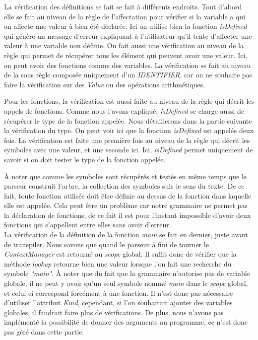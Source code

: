\documentclass[a4paper]{article}%
\begin{document}
La vérification des définitions se fait se fait à différents endroits. Tout
d'abord elle se fait au niveau de la règle de l'affectation pour vérifier si la
variable a qui on affecte une valeur à bien été déclarée. Ici on utilise bien la
fonction \textit{isDefined} qui génère un message d'erreur expliquant à
l'utilisateur qu'il tente d'affecter une valeur à une variable non définie. On
fait aussi une vérification au niveau de la règle qui permet de récupérer tous
les élément qui peuvent avoir une valeur. Ici, on peut avoir des fonctions
comme des variables. La vérification se fait au niveau de la sous règle composée
uniquement d'un \textit{IDENTIFIER}, car on ne souhaite pas faire la
vérification sur des \textit{Value} ou des opérations arithmétiques.

Pour les fonctions, la vérification est aussi faite au niveau de la règle qui
décrit les appels de fonctions. Comme nous l'avons expliqué, \textit{isDefined}
se charge aussi de récupérer le type de la fonction appelée. Nous détaillerons
dans la partie suivante la vérification du type. On peut voir ici que la
fonction \textit{isDefined} est appelée deux fois. La vérification est faite une
première fois au niveau de la règle qui décrit les symboles avec une valeur, et
une seconde ici. Ici, \textit{isDefined} permet uniquement de savoir si on
doit tester le type de la fonction appelée.

À noter que comme les symboles sont récupérés et testés en même temps que le
parseur construit l'arbre, la collection des symboles suis le sens du texte. De
ce fait, toute fonction utilisée doit être définie au dessus de la fonction dans
laquelle elle est appelée. Cela peut être un problème car notre grammaire ne
permet pas la déclaration de fonctions, de ce fait il est pour l'instant
impossible d'avoir deux fonctions qui s'appellent entre elles sans avoir
d'erreur.\\

La vérification de la définition de la fonction \textit{main} se fait en
dernier, juste avant de transpiler. Nous savons que quand le parseur à fini de
tourner le \textit{ContextManager} est retourné au \textit{scope} global. Il
suffit donc de vérifier que la méthode \textit{lookup} retourne bien une valeur
lorsque l'on fait une recherche du symbole \textit{"main"}. À noter que du fait
que la grammaire n'autorise pas de variable globale, il ne peut y avoir qu'un
seul symbole nommé \textit{main} dans le \textit{scope} global, et celui ci
correspond forcément à une fonction. Il n'est donc pas nécessaire d'utiliser
l'attribut \textit{Kind}, cependant, si l'on souhaitait ajouter des variables
globales, il faudrait faire plus de vérifications. De plus, nous n'avons pas
implémenté la possibilité de donner des arguments au programme, ce n'est donc
pas géré dans cette partie. %
\end{document}
